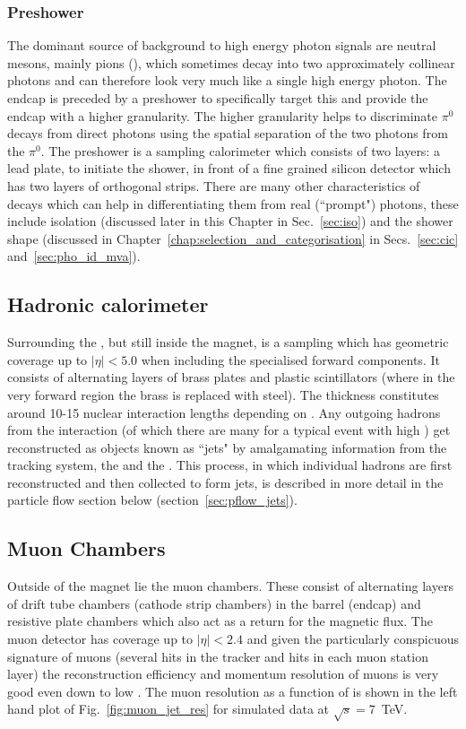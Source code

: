 \subsubsection{Preshower}
The dominant source of background to high energy photon signals are neutral mesons, mainly pions (\pizero), which sometimes decay into two approximately collinear photons and can therefore look very much like a single high energy photon. The \ECAL endcap is preceded by a preshower to specifically target this and provide the endcap with a higher granularity. The higher granularity helps to discriminate $\pi^{0}$ decays from direct photons using the spatial separation of the two photons from the $\pi^{0}$. The preshower is a sampling calorimeter which consists of two layers: a lead plate, to initiate the shower, in front of a fine grained silicon detector which has two layers of orthogonal strips. There are many other characteristics of \pizero decays which can help in differentiating them from real (``prompt") photons, these include isolation (discussed later in this Chapter in Sec.~\ref{sec:iso}) and the shower shape (discussed in Chapter~\ref{chap:selection_and_categorisation} in Secs.~\ref{sec:cic} and~\ref{sec:pho_id_mva}).

\subsection{Hadronic calorimeter}
\label{sec:hcal}

Surrounding the \ECAL, but still inside the magnet, is a sampling \HCAL which has geometric coverage up to $|\eta|<5.0$ when including the specialised forward components. It consists of alternating layers of brass plates and plastic scintillators (where in the very forward region the brass is replaced with steel). The \HCAL thickness constitutes around 10-15 nuclear interaction lengths depending on \eta. Any outgoing hadrons from the interaction (of which there are many for a typical event with high \ET) get reconstructed as objects known as ``jets" by amalgamating information from the tracking system, the \ECAL and the \HCAL. This process, in which individual hadrons are first reconstructed and then collected to form jets, is described in more detail in the particle flow section below (section~\ref{sec:pflow_jets}).  

\subsection{Muon Chambers}
\label{sec:muons}
Outside of the magnet lie the \CMS muon chambers. These consist of alternating layers of drift tube chambers (cathode strip chambers) in the barrel (endcap) and resistive plate chambers which also act as a return for the magnetic flux. The muon detector has coverage up to $|\eta|<2.4$ and given the particularly conspicuous signature of muons (several hits in the tracker and hits in each muon station layer) the reconstruction efficiency and momentum resolution of muons is very good even down to low \pT. The muon resolution as a function of \pT is shown in the left hand plot of Fig.~\ref{fig:muon_jet_res} for simulated data at $\sqrt{s}=7$~TeV.

